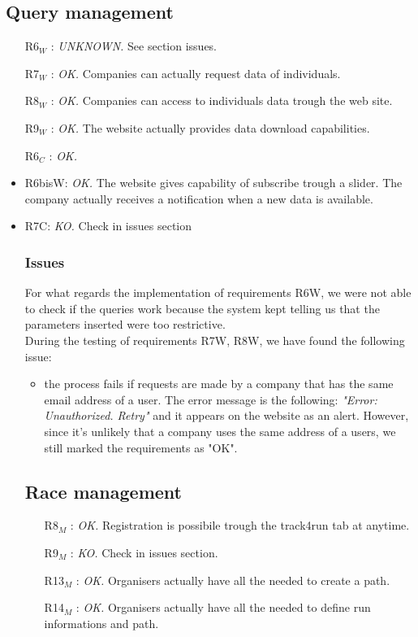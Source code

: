 \documentclass{article}
\begin{document}
\subsection{Query management}
\begin{itemize}
	\item [R6$_W$]: \textit{UNKNOWN.} See section issues.
	\item [R7$_W$]: \textit{OK.} Companies can actually request data of individuals. 
	\item [R8$_W$]: \textit{OK.} Companies can access to individuals data trough the web site.
	\item [R9$_W$]: \textit{OK.} The website actually provides data download capabilities.
	\item [R6$_C$]: \textit{OK.}
	\item R6bisW: \textit{OK.} The website gives capability of subscribe trough a slider. The company actually receives a notification when a new data is available.
	\item R7C: \textit{KO.} Check in issues section

\subsubsection{Issues}

For what regards the implementation of requirements R6W, we were not able to check if the queries work because the system kept telling us that the parameters inserted were too restrictive.\\

During the testing of requirements R7W, R8W, we have found the following issue:
\begin{itemize}
	\item the process fails if requests are made by a company that has the same email address of a user. The error message is the following: \textit{"Error: Unauthorized. Retry"} and it appears on the website as an alert. However, since it's unlikely that a company uses the same address of a users, we still marked the requirements as "OK".
\end{itemize}

\subsection{Race management}
\begin{itemize}
	\item [R8$_M$]: \textit{OK.} Registration is possibile trough the track4run tab at anytime.
	\item [R9$_M$]: \textit{KO.} Check in issues section.
	\item [R13$_M$]: \textit{OK.} Organisers actually have all the needed to create a path.
	\item [R14$_M$]: \textit{OK.} Organisers actually have all the needed to define run informations and path.
\end{itemize}


\end{itemize}
\end{document}

